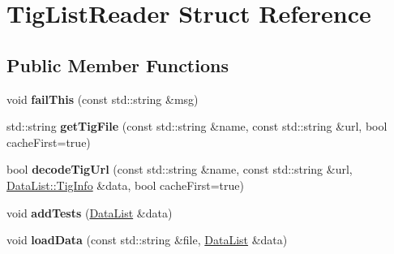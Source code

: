 \hypertarget{struct_tig_list_reader}{\section{Tig\-List\-Reader Struct Reference}
\label{struct_tig_list_reader}
}
\subsection*{Public Member Functions}
\begin{DoxyCompactItemize}
\item 
\hypertarget{struct_tig_list_reader_aea851ee05be59dda427ab57ccec2e00f}{void {\bfseries fail\-This} (const std\-::string \&msg)}\label{struct_tig_list_reader_aea851ee05be59dda427ab57ccec2e00f}

\item 
\hypertarget{struct_tig_list_reader_a769b49fc8aca9f04ca0408eb54851032}{std\-::string {\bfseries get\-Tig\-File} (const std\-::string \&name, const std\-::string \&url, bool cache\-First=true)}\label{struct_tig_list_reader_a769b49fc8aca9f04ca0408eb54851032}

\item 
\hypertarget{struct_tig_list_reader_a560febf693e55b548a54d0601285b57e}{bool {\bfseries decode\-Tig\-Url} (const std\-::string \&name, const std\-::string \&url, \hyperlink{struct_data_list_1_1_tig_info}{Data\-List\-::\-Tig\-Info} \&data, bool cache\-First=true)}\label{struct_tig_list_reader_a560febf693e55b548a54d0601285b57e}

\item 
\hypertarget{struct_tig_list_reader_af0ff5bc33bb00380a3835b1231ce1cd8}{void {\bfseries add\-Tests} (\hyperlink{struct_data_list}{Data\-List} \&data)}\label{struct_tig_list_reader_af0ff5bc33bb00380a3835b1231ce1cd8}

\item 
\hypertarget{struct_tig_list_reader_ace2eb943f1db6d0091ade31bcfb3eb58}{void {\bfseries load\-Data} (const std\-::string \&file, \hyperlink{struct_data_list}{Data\-List} \&data)}\label{struct_tig_list_reader_ace2eb943f1db6d0091ade31bcfb3eb58}

\end{DoxyCompactItemize}
